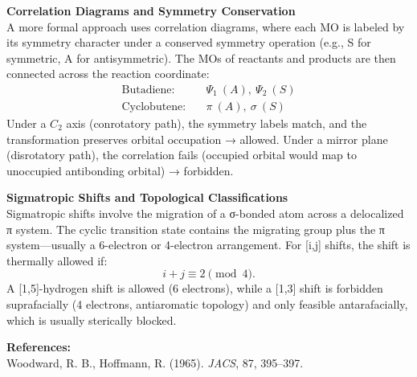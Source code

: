 \begin{technical}
\noindent\textbf{Correlation Diagrams and Symmetry Conservation}\\[0.5em]
A more formal approach uses correlation diagrams, where each MO is labeled by its symmetry character under a conserved symmetry operation (e.g., S for symmetric, A for antisymmetric). The MOs of reactants and products are then connected across the reaction coordinate:
\begin{align*}
\text{Butadiene:} & \quad \Psi_1\ (A),\ \Psi_2\ (S) \\
\text{Cyclobutene:} & \quad \pi\ (A),\ \sigma\ (S)
\end{align*}
Under a \( C_2 \) axis (conrotatory path), the symmetry labels match, and the transformation preserves orbital occupation → allowed. Under a mirror plane (disrotatory path), the correlation fails (occupied orbital would map to unoccupied antibonding orbital) → forbidden.

\noindent\textbf{Sigmatropic Shifts and Topological Classifications}\\[0.5em]
Sigmatropic shifts involve the migration of a σ-bonded atom across a delocalized π system. The cyclic transition state contains the migrating group plus the π system—usually a 6-electron or 4-electron arrangement. For [i,j] shifts, the shift is thermally allowed if:
\[
i + j \equiv 2 \pmod{4}.
\]
A [1,5]-hydrogen shift is allowed (6 electrons), while a [1,3] shift is forbidden suprafacially (4 electrons, antiaromatic topology) and only feasible antarafacially, which is usually sterically blocked.


\noindent\textbf{References:}\\
Woodward, R. B., Hoffmann, R. (1965). \textit{JACS}, 87, 395–397.\\
\end{technical}
